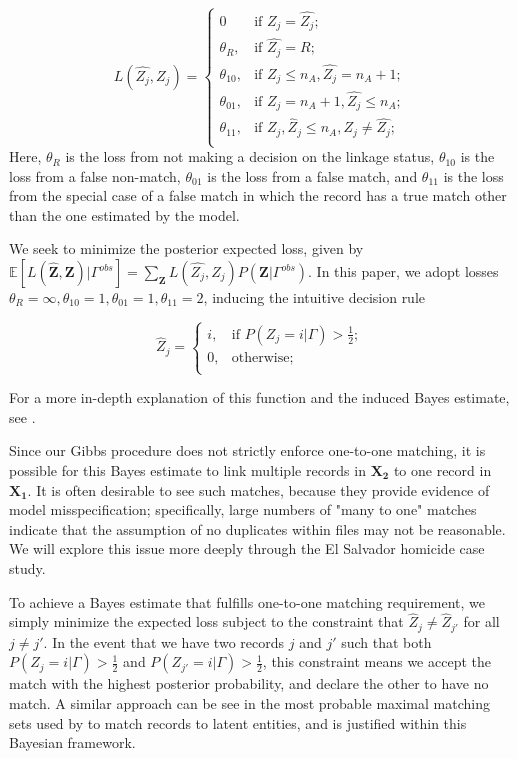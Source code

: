 \documentclass[12pt,letterpaper]{article}
\newcommand{\1}[1]{\mathbb{I}\!\left[#1\right]} %
\begin{document}
{\[L(\hat{Z_j}, Z_j)=\begin{cases} 
	0  & \text{if } Z_j = \hat{Z_j}; \\
	\theta_R,  & \text{if } \hat{Z_j} = R; \\
	\theta_{10},  & \text{if } Z_j \leq n_A,\hat{Z_j} = n_A + 1 ; \\
	\theta_{01},  & \text{if } Z_j = n_A + 1,\hat{Z_j} \leq n_A ; \\
	\theta_{11},  & \text{if } Z_j, \hat{Z}_j \leq n_A, Z_j \neq \hat{Z_j} ; \\
\end{cases}\] Here, \(\theta_R\) is the loss from not making a decision
on the linkage status, \(\theta_{10}\) is the loss from a false
non-match, \(\theta_{01}\) is the loss from a false match, and
\(\theta_{11}\) is the loss from the special case of a false match in
which the record has a true match other than the one estimated by the
model. 

We seek to minimize the posterior expected loss, given by $\mathbb{E}[L(\hat{\mathbf{Z}}, \mathbf{Z})|\Gamma^{obs}] = \sum_{\mathbf{Z}} L(\hat{Z_j}, Z_j)P(\mathbf{Z}|\Gamma^{obs})$. In this paper, we adopt losses
\(\theta_R = \infty, \theta_{10} = 1, \theta_{01} = 1, \theta_{11} = 2\), inducing the intuitive decision rule

\[\hat{Z}_j =\begin{cases} 
	i,  & \text{if } P(Z_j = i |\Gamma) > \frac{1}{2}; \\
	0,  & \text{otherwise} ; \\
\end{cases}\]

For a more in-depth explanation of this function and the induced Bayes
estimate, see \citep{sadinle_bayesian_2017}.

Since our Gibbs procedure does not strictly enforce one-to-one matching, it is possible for this Bayes estimate to link multiple records in $\bm{X_2}$ to one record in $\bm{X_1}$. It is often desirable to see such matches, because they provide evidence of model misspecification; specifically, large numbers of "many to one" matches indicate that the assumption of no duplicates within files may not be reasonable. We will explore this issue more deeply through the El Salvador homicide case study. 

To achieve a Bayes estimate that fulfills one-to-one matching requirement, we simply minimize the expected loss subject to the constraint that $\hat{Z}_j \neq \hat{Z}_{j'}$ for all $j \neq j'$. In the event that we have two records $j$ and $j'$ such that both $P(Z_j = i |\Gamma) > \frac{1}{2}$ and $ P(Z_{j'} = i |\Gamma) > \frac{1}{2}$, this constraint means we accept the match with the highest posterior probability, and declare the other to have no match.  A similar approach can be see in the most probable maximal matching sets used by \citep{steorts_2013} to match records to latent entities, and is justified within this Bayesian framework.

}
\end{document}
